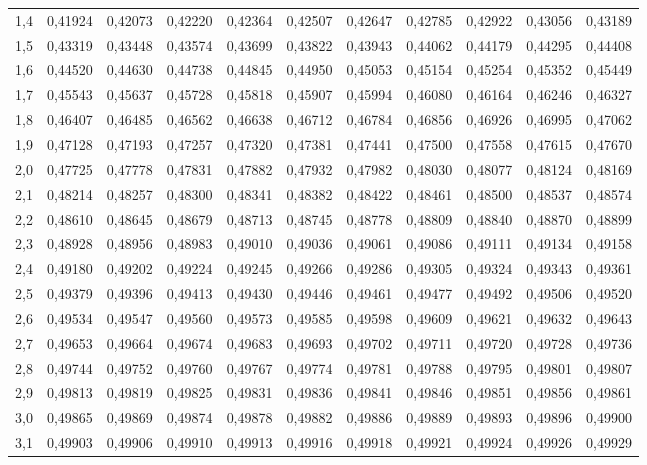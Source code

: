 \documentclass[14pt,aspectratio=1610]{beamer}
\begin{document}
\begin{frame}[fragile]{}
\begin{block}{}
\begin{center}
{\begin{tabular}{rrrrrrrrrrr}
  1,4 & 0,41924 & 0,42073 & 0,42220 & 0,42364 & 0,42507 & 0,42647 & 0,42785 & 0,42922 & 0,43056 & 0,43189 \\ 
  1,5 & 0,43319 & 0,43448 & 0,43574 & 0,43699 & 0,43822 & 0,43943 & 0,44062 & 0,44179 & 0,44295 & 0,44408 \\ 
  1,6 & 0,44520 & 0,44630 & 0,44738 & 0,44845 & 0,44950 & 0,45053 & 0,45154 & 0,45254 & 0,45352 & 0,45449 \\ 
  1,7 & 0,45543 & 0,45637 & 0,45728 & 0,45818 & 0,45907 & 0,45994 & 0,46080 & 0,46164 & 0,46246 & 0,46327 \\ 
  1,8 & 0,46407 & 0,46485 & 0,46562 & 0,46638 & 0,46712 & 0,46784 & 0,46856 & 0,46926 & 0,46995 & 0,47062 \\ 
  1,9 & 0,47128 & 0,47193 & 0,47257 & 0,47320 & 0,47381 & 0,47441 & 0,47500 & 0,47558 & 0,47615 & 0,47670 \\ 
  2,0 & 0,47725 & 0,47778 & 0,47831 & 0,47882 & 0,47932 & 0,47982 & 0,48030 & 0,48077 & 0,48124 & 0,48169 \\ 
  2,1 & 0,48214 & 0,48257 & 0,48300 & 0,48341 & 0,48382 & 0,48422 & 0,48461 & 0,48500 & 0,48537 & 0,48574 \\ 
  2,2 & 0,48610 & 0,48645 & 0,48679 & 0,48713 & 0,48745 & 0,48778 & 0,48809 & 0,48840 & 0,48870 & 0,48899 \\ 
  2,3 & 0,48928 & 0,48956 & 0,48983 & 0,49010 & 0,49036 & 0,49061 & 0,49086 & 0,49111 & 0,49134 & 0,49158 \\ 
  2,4 & 0,49180 & 0,49202 & 0,49224 & 0,49245 & 0,49266 & 0,49286 & 0,49305 & 0,49324 & 0,49343 & 0,49361 \\ 
  2,5 & 0,49379 & 0,49396 & 0,49413 & 0,49430 & 0,49446 & 0,49461 & 0,49477 & 0,49492 & 0,49506 & 0,49520 \\ 
  2,6 & 0,49534 & 0,49547 & 0,49560 & 0,49573 & 0,49585 & 0,49598 & 0,49609 & 0,49621 & 0,49632 & 0,49643 \\ 
  2,7 & 0,49653 & 0,49664 & 0,49674 & 0,49683 & 0,49693 & 0,49702 & 0,49711 & 0,49720 & 0,49728 & 0,49736 \\ 
  2,8 & 0,49744 & 0,49752 & 0,49760 & 0,49767 & 0,49774 & 0,49781 & 0,49788 & 0,49795 & 0,49801 & 0,49807 \\ 
  2,9 & 0,49813 & 0,49819 & 0,49825 & 0,49831 & 0,49836 & 0,49841 & 0,49846 & 0,49851 & 0,49856 & 0,49861 \\ 
  3,0 & 0,49865 & 0,49869 & 0,49874 & 0,49878 & 0,49882 & 0,49886 & 0,49889 & 0,49893 & 0,49896 & 0,49900 \\ 
  3,1 & 0,49903 & 0,49906 & 0,49910 & 0,49913 & 0,49916 & 0,49918 & 0,49921 & 0,49924 & 0,49926 & 0,49929 \\ 

\end{tabular}}
\end{center}
\end{block}
\end{frame}
\end{document}
